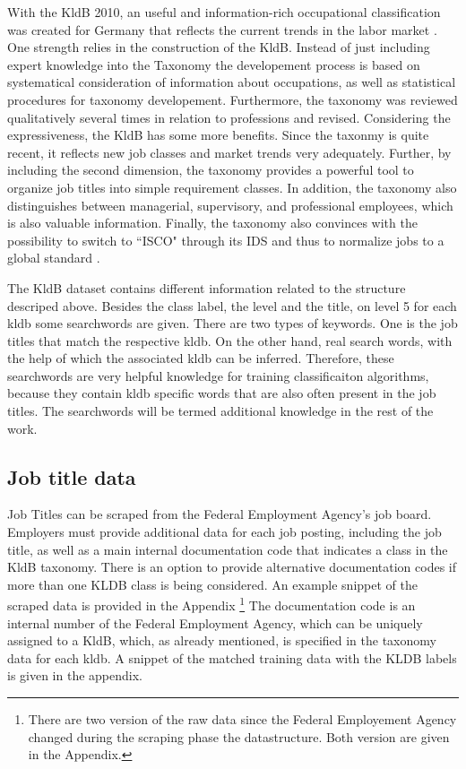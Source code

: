 \documentclass[12pt, a4paper, titlepage]{article}
\begin{document}
With the \ac{KldB} 2010, an useful and information-rich occupational classification was created for Germany that reflects the current trends in the labor market \citep{Paulus2013}. One strength relies in the construction of the \ac{KldB}. Instead of just including expert knowledge into the Taxonomy the developement process is based on systematical consideration of information about occupations, as well as statistical procedures for taxonomy developement. Furthermore, the taxonomy was reviewed qualitatively several times in relation to professions and revised. Considering the expressiveness, the \ac{KldB} has some more benefits. Since the taxonmy is quite recent, it reflects new job classes and market trends very adequately. Further, by including the second dimension, the taxonomy provides a powerful tool to organize job titles into simple requirement classes.  In addition, the taxonomy also distinguishes between managerial, supervisory, and professional employees, which is also valuable information. Finally, the taxonomy also convinces with the possibility to switch to ``\ac{ISCO}" through its IDS and thus to normalize jobs to a global standard \citep{Bundesagentur2011b}.

The \ac{KldB} dataset contains different information related to the structure descriped above. Besides the class label, the level and the title, on level 5 for each kldb some searchwords are given. There are two types of keywords. One is the job titles that match the respective kldb. On the other hand, real search words, with the help of which the associated kldb can be inferred. Therefore, these searchwords are very helpful knowledge for training classificaiton algorithms, because they contain kldb specific words that are also often present in the job titles. The searchwords will be termed additional knowledge in the rest of the work. 
 
\subsection{Job title data}
Job Titles can be scraped from the Federal Employment Agency's job board. Employers must provide additional data for each job posting, including the job title, as well as a main internal documentation code that indicates a class in the \ac{KldB} taxonomy. There is an option to provide alternative documentation codes if more than one KLDB class is being considered. An example snippet of the scraped data is provided in the Appendix \footnote{There are two version of the raw data since the Federal Employement Agency changed during the scraping phase the datastructure. Both version are given in the Appendix.} The documentation code is an internal number of the Federal Employment Agency, which can be uniquely assigned to a \ac{KldB}, which, as already mentioned, is specified in the taxonomy data for each kldb. A snippet of the matched training data with the KLDB labels is given in the appendix.
\end{document}
